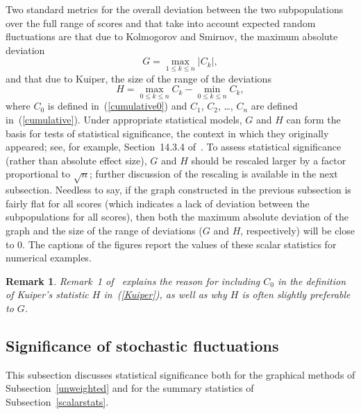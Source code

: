 \documentclass{article}
\newtheorem{remark1}[theorem]{Remark}
\newenvironment{remark}{\begin{remark1} \rm}{\end{remark1}}
\begin{document}
Two standard metrics for the overall deviation between the two subpopulations
over the full range of scores
and that take into account expected random fluctuations are that due
to Kolmogorov and Smirnov, the maximum absolute deviation
%
\begin{equation}
\label{Kolmogorov-Smirnov}
G = \max_{1 \le k \le n} |C_k|,
\end{equation}
%
and that due to Kuiper, the size of the range of the deviations
%
\begin{equation}
\label{Kuiper}
H = \max_{0 \le k \le n} C_k - \min_{0 \le k \le n} C_k,
\end{equation}
%
where $C_0$ is defined in~(\ref{cumulative0})
and $C_1$, $C_2$, \dots, $C_n$ are defined in~(\ref{cumulative}).
Under appropriate statistical models,
$G$ and $H$ can form the basis for tests of statistical significance,
the context in which they originally appeared;
see, for example, Section~14.3.4 of~\cite{press-teukolsky-vetterling-flannery}.
To assess statistical significance (rather than absolute effect size),
$G$ and $H$ should be rescaled larger by a factor proportional to $\sqrt{n}$;
further discussion of the rescaling is available in the next subsection.
Needless to say, if the graph constructed in the previous subsection
is fairly flat for all scores (which indicates a lack of deviation
between the subpopulations for all scores),
then both the maximum absolute deviation of the graph and the size of the range
of deviations ($G$ and $H$, respectively) will be close to 0.
The captions of the figures report the values of these scalar statistics
for numerical examples.

\begin{remark}
Remark~1 of~\cite{tygert} explains the reason for including $C_0$
in the definition of Kuiper's statistic $H$ in~(\ref{Kuiper}),
as well as why $H$ is often slightly preferable to $G$.
\end{remark}


\subsection{Significance of stochastic fluctuations}
\label{significance}

This subsection discusses statistical significance
both for the graphical methods of Subsection~\ref{unweighted}
and for the summary statistics of Subsection~\ref{scalarstats}.
\end{document}

